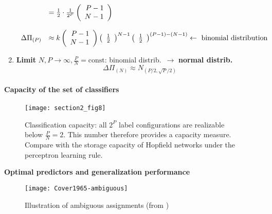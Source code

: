\begin{enumerate}[(1)]
\begin{equation}
\begin{array}{ll}
		& = \frac{1}{2} \cdot \frac{1}{2^P} \left( \begin{array}{rrrrrrrrrrrrrrrrrrrrrrrrrr} P-1 \\N-1\\ \end{array} \right) \\\\
		\Delta \Pi_{(P)} 
		& \approx k \left( \begin{array}{rrrrrrrrrrrrrrrrrrrrrrrrrr} P-1 \\ N-1\\ \end{array} \right) \left( \begin{array}{rrrrrrrrrrrrrrrrrrrrrrrrrr} \frac{1}{2}\\ \end{array} \right)^{N-1}
			\left( \begin{array}{rrrrrrrrrrrrrrrrrrrrrrrrrr} \frac{1}{2}\\ \end{array} \right)^{(P-1)-(N-1)} 
			\leftarrow \text{ binomial distribution}
	\end{array}
\end{equation}
\item \textbf{Limit} $N, P \rightarrow \infty, \frac{P}{N} = \mathrm{const}$:
binomial distrib.\ $\rightarrow$ \textbf{normal distrib.}
\begin{equation}\tag{asymptotical distribution}
	\Delta \Pi_{(N)} \approx \mathit{N}_{(P/2, \sqrt{P}/2)}
\end{equation}


\end{enumerate}

\paragraph{Capacity of the set of classifiers}
\begin{figure}[h]
  \centering
	\texttt{[image: section2\_fig8]}  
        \caption{Classification capacity: all $2^P$ label configurations are
          realizable below $\frac{P}{N} = 2$. This number therefore
          provides a capacity measure. Compare with
          the storage capacity of Hopfield networks under the
          perceptron learning rule. }
\end{figure}


{\bf Optimal predictors and generalization performance}

  \begin{figure}[h]
    \centering
\texttt{[image: Cover1965-ambiguous]}    
    \caption{Illustration of ambiguous assignments (from \cite{Cover1965})}
  \end{figure}

